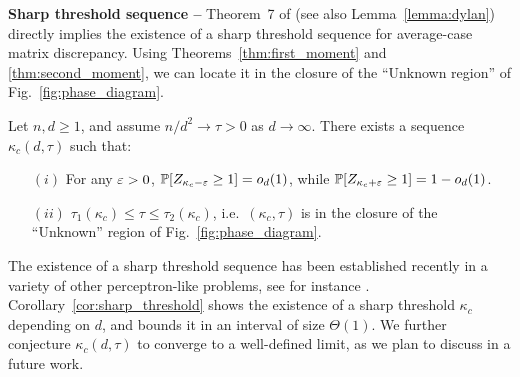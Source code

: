 \myskip 
\textbf{Sharp threshold sequence --}
Theorem~7 of \cite{altschuler2023zero} (see also Lemma~\ref{lemma:dylan})
directly implies the existence of a sharp threshold sequence for average-case matrix discrepancy. 
Using Theorems~\ref{thm:first_moment} and \ref{thm:second_moment}, we can locate it
in the closure of the ``Unknown region'' of Fig.~\ref{fig:phase_diagram}.
\begin{corollary}\label{cor:sharp_threshold}
    \noindent
    Let $n, d \geq 1$, and assume $n/d^2 \to \tau > 0$ as $d\to \infty$. There exists a sequence 
    $\kappa_c(d,\tau)$ such that: 
    \begin{itemize}
        \item[$(i)$] For any $\varepsilon > 0$, $\mathbb{P}[Z_{\kappa_c - \varepsilon} \geq 1] = o_d(1)$, while $\mathbb{P}[Z_{\kappa_c + \varepsilon} \geq 1] = 1 - o_d(1)$.
        \item[$(ii)$]  $\tau_1(\kappa_c) \leq \tau \leq \tau_2(\kappa_c)$, i.e.\ $(\kappa_c,\tau)$ is in the closure of the ``Unknown'' region of Fig.~\ref{fig:phase_diagram}.
    \end{itemize}
\end{corollary}
\noindent
The existence of a sharp threshold sequence has been established recently in a variety of other perceptron-like problems, see for instance \cite{talagrand1999self,talagrand2011mean,xu2021sharp,nakajima2023sharp,altschuler2023zero}.
Corollary~\ref{cor:sharp_threshold} shows the existence of a sharp threshold $\kappa_c$ depending on $d$, and bounds it in an interval of size $\Theta(1)$. 
We further conjecture $\kappa_c(d,\tau)$ to converge to a well-defined limit, as we plan to discuss in a future work.

